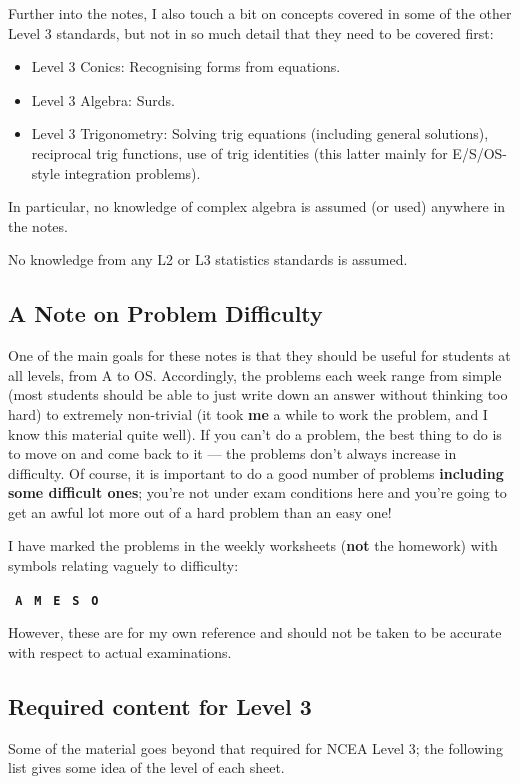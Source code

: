 Further into the notes, I also touch a bit on concepts covered in some of the other Level 3 standards,
but not in so much detail that they need to be covered first:
\begin{itemize}
  \item Level 3 Conics: Recognising forms from equations.
  \item Level 3 Algebra: Surds.
  \item Level 3 Trigonometry: Solving trig equations (including general solutions), reciprocal trig functions, use
                              of trig identities (this latter mainly for E/S/OS-style integration problems).
\end{itemize}
In particular, no knowledge of complex algebra is assumed (or used) anywhere in the notes.

No knowledge from any L2 or L3 statistics standards is assumed.

\subsection*{A Note on Problem Difficulty}
One of the main goals for these notes is that they should be useful for students at all levels, from A to OS. Accordingly, the
problems each week range from simple (most students should be able to just write down an answer without thinking too hard) to
extremely non-trivial (it took \textbf{me} a while to work the problem, and I know this material quite well). If you can't do
a problem, the best thing to do is to move on and come back to it --- the problems don't always increase in difficulty. Of course,
it is important to do a good number of problems \textbf{including some difficult ones}; you're not under exam conditions here
and you're going to get an awful lot more out of a hard problem than an easy one!

I have marked the problems in the weekly worksheets (\textbf{not} the homework) with symbols relating vaguely to difficulty:

\begin{center}
\texttt{\textbf{\color{Cerulean} A}}
\texttt{\textbf{\color{PineGreen} M}}
\texttt{\textbf{\color{WildStrawberry} E}}
\texttt{\textbf{\color{Goldenrod} S}}
\texttt{\textbf{\color{BurntOrange} O}}
\end{center}

However, these are for my own reference and should not be taken to be accurate with respect to actual examinations.

\subsection*{Required content for Level 3}
Some of the material goes beyond that required for NCEA Level 3; the following list gives some idea of the level of each sheet.

